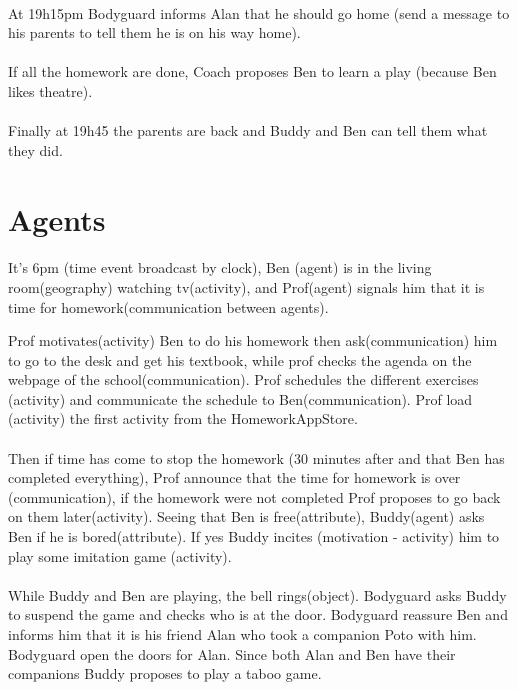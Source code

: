 \paragraph{}
At 19h15pm Bodyguard informs Alan that he should go home (send a message to his parents to tell them he is on his way home). 
\paragraph{}
If all the homework are done, Coach proposes Ben to learn a play (because Ben likes theatre). 
\paragraph{}
Finally at 19h45 the parents are back and Buddy and Ben can tell them what they did. 
\section{Agents}
\paragraph{}
It's 6pm (time event broadcast by clock), Ben (agent) is in the living room(geography) watching tv(activity), and Prof(agent) signals him that it is time for homework(communication between agents).

Prof motivates(activity) Ben to do his homework then ask(communication) him to go to the desk and get his textbook, while prof checks the agenda on the webpage of the school(communication). 
Prof schedules the different exercises (activity) and communicate the schedule to Ben(communication).
Prof load (activity) the first activity from the Homework\-AppStore.
\paragraph{}
Then if time has come to stop the homework (30 minutes after and that Ben has completed everything), Prof announce that the time for homework is over (communication), if the homework were not completed Prof proposes to go back on them later(activity).
Seeing that Ben is free(attribute), Buddy(agent) asks Ben if he is bored(attribute). If yes Buddy incites (motivation - activity) him to play some imitation game (activity).
\paragraph{}
While Buddy and Ben are playing, the bell rings(object). Bodyguard asks Buddy to suspend the game and checks who is at the door. Bodyguard reassure Ben and informs him that it is his friend Alan who took a companion Poto with him. 
Bodyguard open the doors for Alan. Since both Alan and Ben have their companions Buddy proposes to play a taboo game. 
